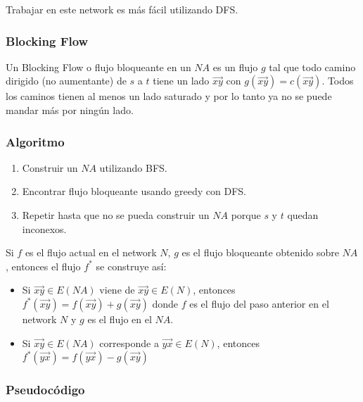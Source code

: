 \documentclass[10pt,a4paper]{article}
\begin{document}
Trabajar en este network es más fácil utilizando DFS.

\subsubsection*{Blocking Flow}

Un Blocking Flow o flujo bloqueante en un $NA$ es un flujo $g$ tal que todo camino dirigido (no aumentante) de $s$ a $t$ tiene un lado $\overrightarrow{xy}$ con $g(\overrightarrow{xy}) = c(\overrightarrow{xy})$. Todos los caminos tienen al menos un lado saturado y por lo tanto ya no se puede mandar más por ningún lado.

\subsubsection*{Algoritmo}

\begin{enumerate}

	\item Construir un $NA$ utilizando BFS.
	\item Encontrar flujo bloqueante usando greedy con DFS.
	\item Repetir hasta que no se pueda construir un $NA$ porque $s$ y $t$ quedan inconexos.
\end{enumerate}

Si $f$ es el flujo actual en el network $N$, $g$ es el flujo bloqueante obtenido sobre $NA$, entonces el flujo $f^*$ se construye así:

\begin{itemize}

	\item Si $\overrightarrow{xy}\in E(NA)$ viene de $\overrightarrow{xy} \in E(N)$, entonces $f^*(\overrightarrow{xy}) = f(\overrightarrow{xy}) + g(\overrightarrow{xy})$ donde $f$ es el flujo del paso anterior en el network $N$ y $g$ es el flujo en el $NA$.
	\item Si $\overrightarrow{xy} \in E(NA)$ corresponde a $\overrightarrow{yx} \in E(N)$, entonces $f^*(\overrightarrow{yx}) = f(\overrightarrow{yx}) - g(\overrightarrow{xy})$
\end{itemize}

\subsubsection*{Pseudocódigo}
\end{document}
